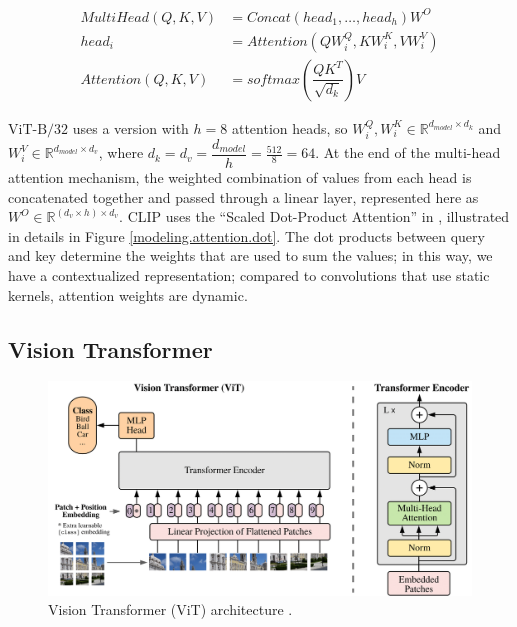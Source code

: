 \begin{equation} \label{mha}
\begin{split}
    MultiHead(Q,K,V) & = Concat({head}_1,\dots,{head}_h)W^O \\
    {head}_i & = Attention(QW_i^{Q}, KW_i^{K}, VW_i^{V}) \\
    Attention(Q,K,V) & = softmax(\dfrac{QK^T}{\sqrt{d_k}})V 
\end{split}
\end{equation}

$\text{ViT-B}/32$ uses a version with $h = 8$ attention heads, so $W_i^{Q}, W_i^{K} \in \mathbb{R}^{d_{model} \times d_k}$ and $W_i^{V} \in \mathbb{R}^{d_{model} \times d_v}$, where $d_k = d_v = \dfrac{d_{model}}{h} = \frac{512}{8} = 64$. 
At the end of the multi-head attention mechanism, the weighted combination of values from each head is concatenated together and passed through a linear layer, represented here as $W^O \in \mathbb{R}^{(d_v \times h) \times d_v}$. 
CLIP uses the ``Scaled Dot-Product Attention'' in \cite{attentionAllYouNeed}, illustrated in details in Figure \ref{modeling.attention.dot}. The dot products between query and key determine the weights that are used to sum the values; in this way, we have a contextualized representation; compared to convolutions that use static kernels, attention weights are dynamic.   

\subsection{Vision Transformer}
\begin{figure}[!htb]
\centering
\includegraphics[width=0.7\linewidth]{modeling/visionTransformer.png}  
\caption{Vision Transformer (ViT) architecture \citep{ViT}.}
\label{modeling.visionTransformer}
\end{figure}

